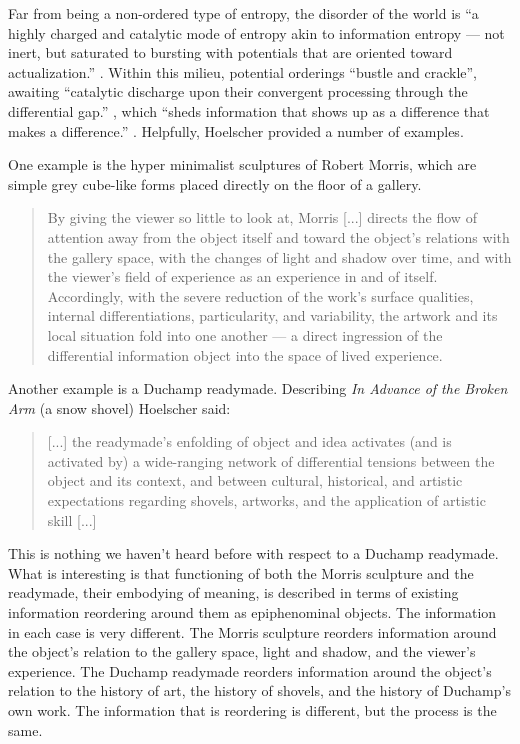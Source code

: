 \documentclass[letterpaper]{article}
\begin{document}
    Far from being a non-ordered type of entropy, the disorder of the world is “a highly charged and catalytic mode of entropy akin to information entropy — not inert, but saturated to bursting with potentials that are oriented toward actualization.” \citep[p.72]{HoelscherArtAsInfrmtn2021}. Within this milieu, potential orderings “bustle and crackle”, awaiting “catalytic discharge upon their convergent processing through the differential gap.” \citep[p.73]{HoelscherArtAsInfrmtn2021}, which “sheds information that shows up as a difference that makes a difference.” \citep[p.75]{HoelscherArtAsInfrmtn2021}. Helpfully, Hoelscher provided a number of examples.

    One example is the hyper minimalist sculptures of Robert Morris, which are simple grey cube-like forms placed directly on the floor of a gallery.

    \begin{quote}
        By giving the viewer so little to look at, Morris [...] directs the flow of attention away from the object itself and toward the object's relations with the gallery space, with the changes of light and shadow over time, and with the viewer's field of experience as an experience in and of itself. Accordingly, with the severe reduction of the work's surface qualities, internal differentiations, particularity, and variability, the artwork and its local situation fold into one another — a direct ingression of the differential information object into the space of lived experience. \citep[p.78]{HoelscherArtAsInfrmtn2021}
    \end{quote}

    Another example is a Duchamp readymade. Describing \emph{In Advance of the Broken Arm} (a snow shovel) Hoelscher said:

    \begin{quote}
        [...] the readymade's enfolding of object and idea activates (and is activated by) a wide-ranging network of differential tensions between the object and its context, and between cultural, historical, and artistic expectations regarding shovels, artworks, and the application of artistic skill [...]
    \end{quote}

    This is nothing we haven't heard before with respect to a Duchamp readymade. What is interesting is that functioning of both the Morris sculpture and the readymade, their embodying of meaning, is described in terms of existing information reordering around them as epiphenominal objects. The information in each case is very different. The Morris sculpture reorders information around the object's relation to the gallery space, light and shadow, and the viewer's experience. The Duchamp readymade reorders information around the object's relation to the history of art, the history of shovels, and the history of Duchamp's own work. The information that is reordering is different, but the process is the same.
\end{document}
